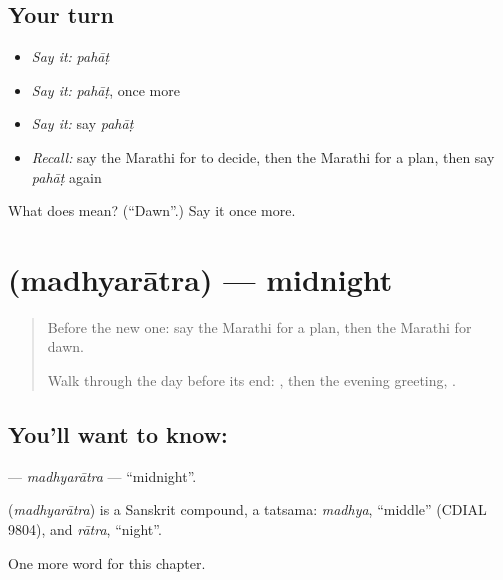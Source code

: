 \subsection*{Your turn}
\begin{itemize}
\raggedright
  \item \emph{Say it:} \emph{pahāṭ}
  \item \emph{Say it:} \emph{pahāṭ}, once more
  \item \emph{Say it:} say \emph{pahāṭ}
  \item \emph{Recall:} say the Marathi for to decide, then the Marathi for a plan, then say \emph{pahāṭ} again
\end{itemize}

\begin{tcolorbox}[breakable,colback=teal!4,colframe=teal!35!black,title={Before you move on}]
What does  mean? (\textquotedblleft{}Dawn\textquotedblright{}.) Say it once more.
\end{tcolorbox}
\section[\texorpdfstring{\mr{मध्यरात्र} (madhyarātra)}{मध्यरात्र (madhyarātra)}]{ (madhyarātra) — midnight}

\label{lesson:MR-C124-madhyaratra}



\begin{quote}
Before the new one: say the Marathi for a plan, then the Marathi for dawn.

Walk through the day before its end: \textbf{}, then the evening greeting, \textbf{ }.
\end{quote}

\subsection*{You'll want to know: }
\textbf{} — \emph{madhyarātra} — \textquotedblleft{}midnight\textquotedblright{}.

\begin{cousinweb}
\textbf{} (\emph{madhyarātra}) is a Sanskrit compound, a tatsama: \emph{madhya}, \textquotedblleft{}middle\textquotedblright{} (CDIAL 9804), and \emph{rātra}, \textquotedblleft{}night\textquotedblright{}.
\end{cousinweb}

\begin{grammarlens}[title={What you've built}]
One more word for this chapter.
\end{grammarlens}

